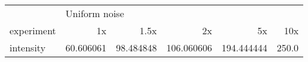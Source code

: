 \begin{tabular}{lrrrrr}
\toprule
{} & \multicolumn{5}{l}{Uniform noise} \\
experiment &            1x &       1.5x &          2x &          5x &    10x \\
\midrule
intensity &     60.606061 &  98.484848 &  106.060606 &  194.444444 &  250.0 \\
\bottomrule
\end{tabular}
